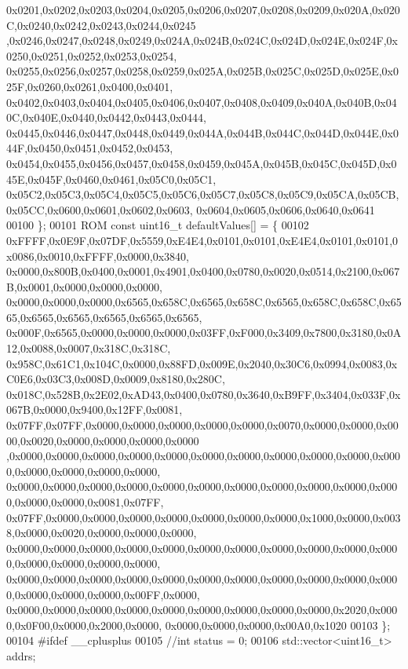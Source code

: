 \begin{DoxyCode}
      0x0201,0x0202,0x0203,0x0204,0x0205,0x0206,0x0207,0x0208,0x0209,0x020A,0x020C,0x0240,0x0242,0x0243,0x0244,0x0245
      ,0x0246,0x0247,0x0248,0x0249,0x024A,0x024B,0x024C,0x024D,0x024E,0x024F,0x0250,0x0251,0x0252,0x0253,0x0254,
      0x0255,0x0256,0x0257,0x0258,0x0259,0x025A,0x025B,0x025C,0x025D,0x025E,0x025F,0x0260,0x0261,0x0400,0x0401,
      0x0402,0x0403,0x0404,0x0405,0x0406,0x0407,0x0408,0x0409,0x040A,0x040B,0x040C,0x040E,0x0440,0x0442,0x0443,0x0444,
      0x0445,0x0446,0x0447,0x0448,0x0449,0x044A,0x044B,0x044C,0x044D,0x044E,0x044F,0x0450,0x0451,0x0452,0x0453,
      0x0454,0x0455,0x0456,0x0457,0x0458,0x0459,0x045A,0x045B,0x045C,0x045D,0x045E,0x045F,0x0460,0x0461,0x05C0,0x05C1,
      0x05C2,0x05C3,0x05C4,0x05C5,0x05C6,0x05C7,0x05C8,0x05C9,0x05CA,0x05CB,0x05CC,0x0600,0x0601,0x0602,0x0603,
      0x0604,0x0605,0x0606,0x0640,0x0641
00100 \};
00101     ROM \textcolor{keyword}{const} uint16\_t defaultValues[] = \{
00102 0xFFFF,0x0E9F,0x07DF,0x5559,0xE4E4,0x0101,0x0101,0xE4E4,0x0101,0x0101,0x0086,0x0010,0xFFFF,0x0000,0x3840,
      0x0000,0x800B,0x0400,0x0001,0x4901,0x0400,0x0780,0x0020,0x0514,0x2100,0x067B,0x0001,0x0000,0x0000,0x0000,
      0x0000,0x0000,0x0000,0x6565,0x658C,0x6565,0x658C,0x6565,0x658C,0x658C,0x6565,0x6565,0x6565,0x6565,0x6565,0x6565,
      0x000F,0x6565,0x0000,0x0000,0x0000,0x03FF,0xF000,0x3409,0x7800,0x3180,0x0A12,0x0088,0x0007,0x318C,0x318C,
      0x958C,0x61C1,0x104C,0x0000,0x88FD,0x009E,0x2040,0x30C6,0x0994,0x0083,0xC0E6,0x03C3,0x008D,0x0009,0x8180,0x280C,
      0x018C,0x528B,0x2E02,0xAD43,0x0400,0x0780,0x3640,0xB9FF,0x3404,0x033F,0x067B,0x0000,0x9400,0x12FF,0x0081,
      0x07FF,0x07FF,0x0000,0x0000,0x0000,0x0000,0x0000,0x0070,0x0000,0x0000,0x0000,0x0020,0x0000,0x0000,0x0000,0x0000
      ,0x0000,0x0000,0x0000,0x0000,0x0000,0x0000,0x0000,0x0000,0x0000,0x0000,0x0000,0x0000,0x0000,0x0000,0x0000,
      0x0000,0x0000,0x0000,0x0000,0x0000,0x0000,0x0000,0x0000,0x0000,0x0000,0x0000,0x0000,0x0000,0x0081,0x07FF,
      0x07FF,0x0000,0x0000,0x0000,0x0000,0x0000,0x0000,0x0000,0x1000,0x0000,0x0038,0x0000,0x0020,0x0000,0x0000,0x0000,
      0x0000,0x0000,0x0000,0x0000,0x0000,0x0000,0x0000,0x0000,0x0000,0x0000,0x0000,0x0000,0x0000,0x0000,0x0000,
      0x0000,0x0000,0x0000,0x0000,0x0000,0x0000,0x0000,0x0000,0x0000,0x0000,0x0000,0x0000,0x0000,0x0000,0x00FF,0x0000,
      0x0000,0x0000,0x0000,0x0000,0x0000,0x0000,0x0000,0x0000,0x0000,0x2020,0x0000,0x0F00,0x0000,0x2000,0x0000,
      0x0000,0x0000,0x0000,0x00A0,0x1020
00103 \};
00104 \textcolor{preprocessor}{#ifdef \_\_cplusplus}
00105     \textcolor{comment}{//int status = 0;}
00106     std::vector<uint16\_t> addrs;

\end{DoxyCode}
